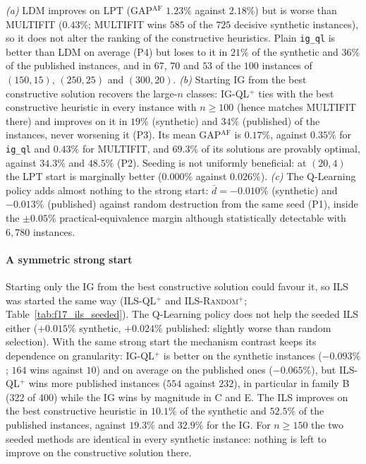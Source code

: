 \documentclass[final,3p,times,11pt,authoryear]{elsarticle}
\begin{document}
\emph{(a)} LDM improves on LPT (GAP$^{\mathrm{AF}}$ $1.23\%$ against
$2.18\%$) but is worse than MULTIFIT ($0.43\%$; MULTIFIT wins $585$ of
the $725$ decisive synthetic instances), so it does not alter the ranking
of the constructive heuristics. Plain \texttt{ig\_ql} is better than LDM
on average (P4) but loses to it in $21\%$ of the synthetic and $36\%$ of
the published instances, and in $67$, $70$ and $53$ of the $100$ instances
of $(150,15)$, $(250,25)$ and $(300,20)$.
\emph{(b)} Starting IG from the best constructive solution recovers the
large-$n$ classes: \textsc{IG-QL}$^{+}$ ties with the best constructive
heuristic in every instance with $n \geq 100$ (hence matches MULTIFIT
there) and improves on it in $19\%$ (synthetic) and $34\%$ (published)
of the instances, never worsening it (P3). Its mean GAP$^{\mathrm{AF}}$
is $0.17\%$, against $0.35\%$ for \texttt{ig\_ql} and $0.43\%$ for
MULTIFIT, and $69.3\%$ of its solutions are provably optimal, against
$34.3\%$ and $48.5\%$ (P2). Seeding is not uniformly beneficial: at
$(20,4)$ the LPT start is marginally better ($0.000\%$ against
$0.026\%$).
\emph{(c)} The Q-Learning policy adds almost nothing to the strong
start: $\bar d = -0.010\%$ (synthetic) and $-0.013\%$ (published) against
random destruction from the same seed (P1), inside the $\pm0.05\%$
practical-equivalence margin although statistically detectable with
$6{,}780$ instances.

\paragraph{A symmetric strong start}
Starting only the IG from the best constructive solution could favour it, so ILS
was started the same way (\textsc{ILS-QL}$^{+}$ and \textsc{ILS-Random}$^{+}$;
Table~\ref{tab:f17_ils_seeded}). The Q-Learning policy does not help the seeded ILS
either ($+0.015\%$ synthetic, $+0.024\%$ published: slightly worse than random
selection). With the same strong start the mechanism contrast keeps its dependence
on granularity: \textsc{IG-QL}$^{+}$ is better on the synthetic instances
($-0.093\%$; $164$ wins against $10$) and on average on the published ones
($-0.065\%$), but \textsc{ILS-QL}$^{+}$ wins more published instances ($554$ against
$232$), in particular in family B (322 of 400) while the IG wins by magnitude in C
and E. The ILS improves on the best constructive heuristic in $10.1\%$ of the
synthetic and $52.5\%$ of the published instances, against $19.3\%$ and $32.9\%$
for the IG. For $n \geq 150$ the two seeded methods are identical in every synthetic
instance: nothing is left to improve on the constructive solution there.
\end{document}
